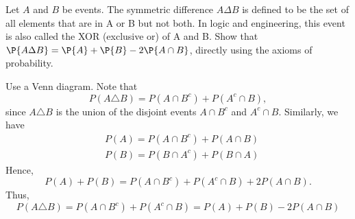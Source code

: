 
\setcounter{theorem}{22}
\begin{exercise}[BH.1.45]
	Let $A$ and $B$ be events. The symmetric difference $A \Delta B$ is defined to be the set of all elements that are in A or B but not both. In logic and engineering, this event is also called the XOR (exclusive or) of A and B. Show that $\P{A \Delta B} = \P{A} + \P{B} - 2 \P{A \cap B}$, directly using the axioms of probability.
\begin{solution}
	Use a Venn diagram. Note that 
	$$P(A \triangle B)=P\left(A \cap B^c\right)+P\left(A^c \cap B\right),$$
	since $A \triangle B$ is the union of the disjoint events $A \cap B^c$ and $A^c \cap B$. Similarly, we have
	$$
	\begin{aligned}
		&P(A)=P\left(A \cap B^c\right)+P(A \cap B) \\
		&P(B)=P\left(B \cap A^c\right)+P(B \cap A)
	\end{aligned}
	$$
	Hence,
	$$
	P(A)+P(B)=P\left(A \cap B^c\right)+P\left(A^c \cap B\right)+2 P(A \cap B) .
	$$
	Thus,
	$$
	P(A \triangle B)=P\left(A \cap B^c\right)+P\left(A^c \cap B\right)=P(A)+P(B)-2 P(A \cap B)
	$$
\end{solution}
\end{exercise}


